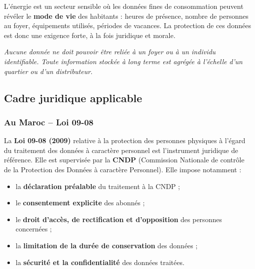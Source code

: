 \documentclass[11pt,a4paper]{article}
\begin{document}
L'énergie est un secteur sensible où les données fines de consommation peuvent révéler le \textbf{mode de vie} des habitants : heures de présence, nombre de personnes au foyer, équipements utilisés, périodes de vacances. La protection de ces données est donc une exigence forte, à la fois juridique et morale.

\begin{infobox}[title=Principe directeur du projet]
\textit{Aucune donnée ne doit pouvoir être reliée à un foyer ou à un individu identifiable. Toute information stockée à long terme est agrégée à l'échelle d'un quartier ou d'un distributeur.}
\end{infobox}

\subsection{Cadre juridique applicable}

\subsubsection{Au Maroc -- Loi 09-08}
La \textbf{Loi 09-08 (2009)} relative à la protection des personnes physiques à l'égard du traitement des données à caractère personnel est l'instrument juridique de référence. Elle est supervisée par la \textbf{CNDP} (Commission Nationale de contrôle de la Protection des Données à caractère Personnel). Elle impose notamment :
\begin{itemize}
  \item la \textbf{déclaration préalable} du traitement à la CNDP ;
  \item le \textbf{consentement explicite} des abonnés ;
  \item le \textbf{droit d'accès, de rectification et d'opposition} des personnes concernées ;
  \item la \textbf{limitation de la durée de conservation} des données ;
  \item la \textbf{sécurité et la confidentialité} des données traitées.
\end{itemize}
\end{document}
